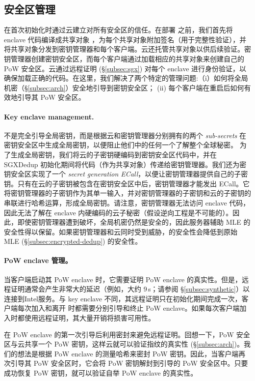 \subsection{安全区管理}
\label{subsec:enclave-management}

\sysname 在首次初始化时通过云建立对所有安全区的信任。在部署 \sysname 之前，我们首先将 enclave 代码编译成共享对象 \cite{sgx}，为每个共享对象附加签名（用于完整性验证），并将共享对象分发到密钥管理器和每个客户端。云还托管共享对象以供后续验证。密钥管理器创建密钥安全区，而每个客户端通过加载相应的共享对象来创建自己的 PoW 安全区。云通过远程证明 (\S\ref{subsec:sgx}) 对每个 enclave 进行身份验证，以确保加载正确的代码。在这里，我们解决了两个特定的管理问题:（i）如何将全局机密（\S\ref{subsec:arch}）安全地引导到密钥安全区； (ii) 每个客户端在重启后如何有效地引导其 PoW 安全区。

\paragraph{Key enclave management.} \sysname 不是完全引导全局密钥，而是根据云和密钥管理器分别拥有的两个 \textit{ sub-secrets} 在密钥安全区中生成全局密钥，以便阻止他们中的任何一个了解整个全球秘密。
为了生成全局密钥，我们将云的子密钥硬编码到密钥安全区代码中，并在 SGXDedup 初始化期间将代码（作为共享对象）传递给密钥管理器。我们还为密钥安全区实现了一个\textit{ secret generation ECall}，以便让密钥管理器提供自己的子密钥。只有在云的子密钥被包含在密钥安全区中后，密钥管理器才能发出 ECall。它将密钥管理器的子密钥作为其单一输入，并对密钥管理器的子密钥和云的子密钥的串联进行哈希运算，形成全局密钥。请注意，密钥管理器无法访问 enclave 代码，因此无法了解在 enclave 内硬编码的云子秘密（假设逆向工程是不可能的）。因此，即使密钥管理器遭到破坏，全局机密仍然是安全的，因此服务器辅助 MLE 的安全性得以保留。如果密钥管理器和云同时受到威胁，\sysname 的安全性会降低到原始 MLE (\S\ref{subsec:encrypted-dedup}) 的安全性。

\paragraph{PoW enclave 管理。} 当客户端启动其 PoW enclave 时，它​​需要证明 PoW enclave 的真实性。但是，远程证明通常会产生非常大的延迟（例如，大约 9\,s；请参阅 \S\ref{subsec:synthetic}）以连接到Intel服务。与 key enclave 不同，其远程证明只在初始化期间完成一次，客户端每次加入和离开 \sysname 时都需要分别引导和终止 PoW enclave。如果每次客户端加入时都使用远程证明，其大量开销将损害可用性。

\sysname 在 PoW enclave 的第一次引导后利用密封来避免远程证明。回想一下，PoW 安全区与云共享一个 PoW 密钥，这样云就可以验证指纹的真实性 (\S\ref{subsec:arch})。我们的想法是根据 PoW enclave 的测量哈希来密封 PoW 密钥。因此，当客户端再次引导其 PoW 安全区时，它会将 PoW 密钥解封到引导的 PoW 安全区中。只要成功恢复 PoW 密钥，就可以验证自举 PoW enclave 的真实性。

